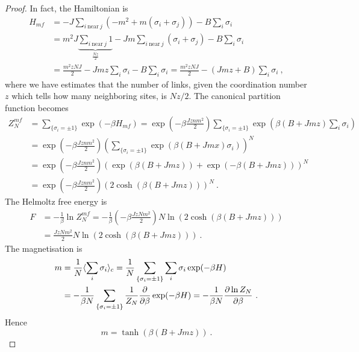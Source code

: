     \begin{proof}
        In fact, the Hamiltonian is 
        \begin{equation*}
        \begin{aligned}
            H_{mf} & = - J \sum_{i~\text{near}~j}  (- m^2 + m(\sigma_i + \sigma_j)) - B \sum_i \sigma_i \\ & = m^2 J \underbrace{\sum_{i~\text{near}~j} 1}_{\frac{Nz}{2}} - J m \sum_{i~\text{near}~j}  (\sigma_i + \sigma_j) - B \sum_i \sigma_i \\ & = \frac{m^2 z N J}{2} - Jmz \sum_i \sigma_i - B \sum_i \sigma_i = \frac{m^2 z N J}{2} - (J m z + B) \sum_i \sigma_i ~,
        \end{aligned}
        \end{equation*}
        where we have estimates that the number of links, given the coordination number $z$ which tells how many neighboring sites, is $Nz/2$.
        The canonical partition function becomes
        \begin{equation*}
        \begin{aligned}
            Z_N^{mf} & = \sum_{\{\sigma_i = \pm 1\}} \exp(- \beta H_{mf}) = \exp(- \beta \frac{J z n m^2}{2}) \sum_{\{\sigma_i = \pm 1\}} \exp(\beta (B + Jmz) \sum_i \sigma_i) \\ & = \exp(- \beta \frac{J z n m^2}{2}) (\sum_{\{\sigma_i = \pm 1\}} \exp(\beta (B + Jmx) \sigma_i))^N \\ & = \exp(- \beta \frac{J z n m^2}{2}) (\exp(\beta(B + Jmz)) + \exp(- \beta (B + Jmz)))^N \\ & = \exp(- \beta \frac{J z n m^2}{2}) (2 \cosh (\beta (B + Jmz)))^N ~.
        \end{aligned}
        \end{equation*}
        The Helmoltz free energy is 
        \begin{equation*}
        \begin{aligned}
            F & = - \frac{1}{\beta} \ln Z_N^{mf} = - \frac{1}{\beta} (- \beta \frac{J z N m^2}{2}) N \ln (2 \cosh (\beta (B + Jmz))) \\ & = \frac{J z N m^2}{2} N \ln (2 \cosh (\beta (B + Jmz))) ~.
        \end{aligned}
        \end{equation*}
        The magnetisation is 
        \begin{equation*}
        \begin{aligned}
             m & = \frac{1}{N} \langle\sum_i \sigma_i\rangle_c = \frac{1}{N} \sum_{\{\sigma_i = \pm 1\}} \sum_i \sigma_i \exp(- \beta H) \\ & = - \frac{1}{\beta N} \sum_{\{\sigma_i = \pm 1\}} \frac{1}{Z_N} \frac{\partial}{\partial\beta} \exp(- \beta H) = - \frac{1}{\beta N} \frac{\partial\ln Z_N}{\partial\beta} ~.
        \end{aligned}
        \end{equation*}
        Hence 
        \begin{equation*}
            m = \tanh (\beta (B + J m z)) ~.
        \end{equation*}
    \end{proof}
    
